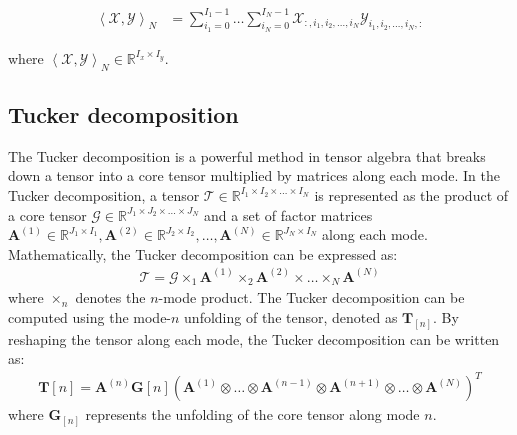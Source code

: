 \documentclass{article}
\begin{document}
\begin{align}
	\left\langle\mathcal{X}, \mathcal{Y}\right\rangle_N &= \sum_{i_1=0}^{I_1-1} \dots \sum_{i_N=0}^{I_N-1} \mathcal{X}_{:, i_1, i_2, \ldots, i_N} \mathcal{Y}_{i_1, i_2, \ldots, i_N, :}
\end{align}

where $\left\langle\mathcal{X}, \mathcal{Y}\right\rangle_N \in \mathbb{R}^{I_x\times I_y} $.

\subsection{Tucker decomposition}
\label{subsec:tucker-decomposition}
The Tucker decomposition \cite{r4} is a powerful method in tensor algebra that breaks down a tensor into a core tensor multiplied by matrices along each mode. In the Tucker decomposition, a tensor $\mathcal{T} \in \mathbb{R}^{I_1 \times I_2 \times \dots \times I_N}$ is represented as the product of a core tensor $\mathcal{G} \in \mathbb{R}^{J_1 \times J_2 \times \dots \times J_N}$ and a set of factor matrices $\mathbf{A}^{(1)} \in \mathbb{R}^{J_1 \times I_1}, \mathbf{A}^{(2)} \in \mathbb{R}^{J_2 \times I_2}, \dots, \mathbf{A}^{(N)} \in \mathbb{R}^{J_N \times I_N}$ along each mode. Mathematically, the Tucker decomposition can be expressed as:
\begin{align}
	\label{eq:tucker-decomposition}
	\mathcal{T} = \mathcal{G} \times_1 \mathbf{A}^{(1)} \times_2 \mathbf{A}^{(2)} \times \dots \times_N \mathbf{A}^{(N)}
\end{align}
where $\times_n$ denotes the $n$-mode product. The Tucker decomposition can be computed using the mode-$n$ unfolding of the tensor, denoted as $\mathbf{T}_{[n]}$. By reshaping the tensor along each mode, the Tucker decomposition can be written as:
\begin{align}
	\label{eq:tucker-decomposition2}
	\mathbf{T}{[n]} = \mathbf{A}^{(n)} \mathbf{G}{[n]} \left(\mathbf{A}^{(1)} \otimes \dots \otimes \mathbf{A}^{(n-1)} \otimes \mathbf{A}^{(n+1)} \otimes \dots \otimes \mathbf{A}^{(N)}\right)^T
\end{align}
where $\mathbf{G}_{[n]}$ represents the unfolding of the core tensor along mode $n$.
\end{document}

